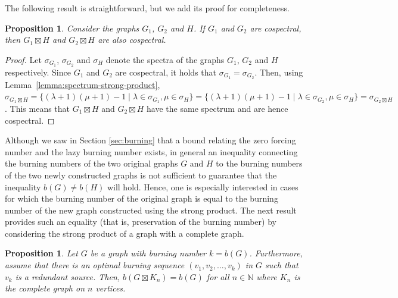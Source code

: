 \documentclass[12pt]{article}
\theoremstyle{plain}
\newtheorem{proposition}[theorem]{Proposition}
\theoremstyle{definition}
\theoremstyle{remark}
\begin{document}
The following result is straightforward, but we add its proof for completeness.

\begin{proposition}  Consider the graphs $G_1$, $G_2$ and $H$. If $G_1$ and $G_2$ are cospectral, then $G_1\boxtimes H$ and $G_2\boxtimes H$ are also cospectral.
    \label{prop:remain cospectral strong product}
\end{proposition}

\begin{proof}
    Let $\sigma_{G_1}$, $\sigma_{G_2}$ and $\sigma_H$ denote the spectra of the graphs $G_1$, $G_2$ and $H$ respectively. Since $G_1$ and $G_2$ are cospectral, it holds that $\sigma_{G_1}=\sigma_{G_2}$. 
    Then, using Lemma~\ref{lemma:spectrum-strong-product}, $\sigma_{G_1 \boxtimes H}=\{(\lambda +1)(\mu+1)-1 \mid \lambda\in\sigma_{G_1},\mu\in\sigma_H\} = \{(\lambda +1)(\mu+1)-1 \mid \lambda\in\sigma_{G_2},\mu\in\sigma_H\} = \sigma_{G_2 \boxtimes H}$. 
    This means that $G_1\boxtimes H$ and $G_2\boxtimes H$ have the same spectrum and are hence cospectral.
\end{proof}

Although we saw in Section \ref{sec:burning} that a bound relating the zero forcing number and the lazy burning number exists, in general an inequality connecting the burning numbers of the two original graphs $G$ and $H$ to the burning numbers of the two newly constructed graphs is not sufficient to guarantee that the inequality $b(G)\neq b(H)$ will hold. Hence, one is especially interested in cases for which the burning number of the original graph is equal to the burning number of the new graph constructed using the strong product.
The next result provides such an equality (that is, preservation of the burning number) by considering the strong product of a graph with a complete graph.

\begin{proposition}
    Let $G$ be a graph with burning number $k=b(G)$. Furthermore, assume that there is an optimal burning sequence $(v_1,v_2,\dots,v_k)$ in $G$ such that $v_k$ is a redundant source. 
    Then, $b(G\boxtimes K_n)=b(G)$ for all $n\in \mathbb{N}$ where $K_n$ is the complete graph on $n$ vertices.
    \label{prop:preservation burning number strong product}
\end{proposition}
\end{document}
